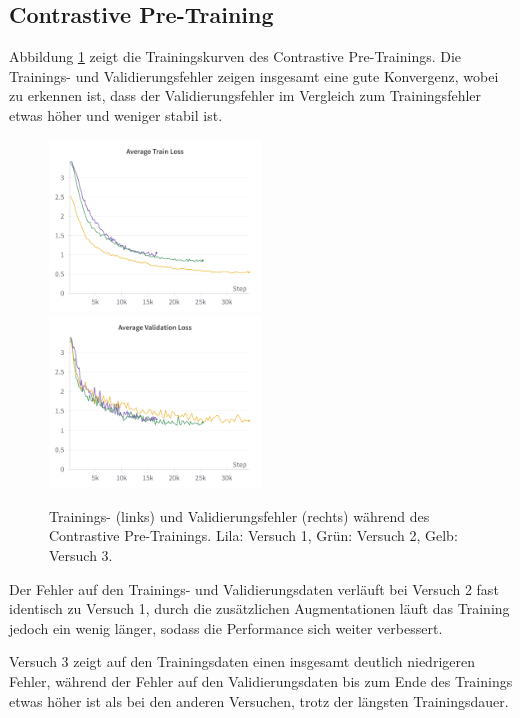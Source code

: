 \subsection{Contrastive Pre-Training} \label{sec:supcon-pre-results}

Abbildung \ref{fig:supcon-pre-loss} zeigt die Trainingskurven des Contrastive Pre-Trainings. Die Trainings- und Validierungsfehler zeigen insgesamt eine gute Konvergenz, wobei zu erkennen ist, dass der Validierungsfehler im Vergleich zum Trainingsfehler etwas höher und weniger stabil ist.

\begin{figure}[h]
	\centering
	\includegraphics[width=0.5\textwidth]{figure_results_supcon-pre_avg-train-loss.png}%
	\includegraphics[width=0.5\textwidth]{figure_results_supcon-pre_avg-val-loss.png}
	\caption{Trainings- (links) und Validierungsfehler (rechts) während des Contrastive Pre-Trainings. \textcolor{exp1}{Lila}: Versuch 1, \textcolor{exp2}{Grün}: Versuch 2, \textcolor{exp3}{Gelb}: Versuch 3.}
	\label{fig:supcon-pre-loss}
\end{figure}

Der Fehler auf den Trainings- und Validierungsdaten verläuft bei Versuch 2 fast identisch zu Versuch 1, durch die zusätzlichen Augmentationen läuft das Training jedoch ein wenig länger, sodass die Performance sich weiter verbessert.

Versuch 3 zeigt auf den Trainingsdaten einen insgesamt deutlich niedrigeren Fehler, während der Fehler auf den Validierungsdaten bis zum Ende des Trainings etwas höher ist als bei den anderen Versuchen, trotz der längsten Trainingsdauer.


